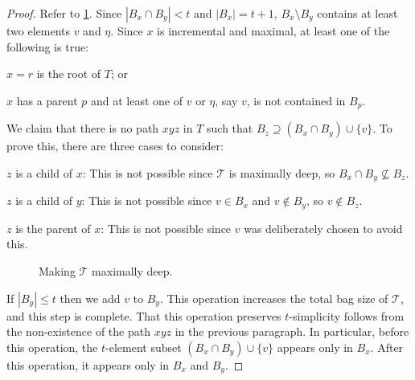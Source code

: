 \documentclass[kpfonts]{patmorin}
\theoremstyle{named}
\begin{document}
\begin{proof}
    Refer to \cref{tough-one}.
    Since $|B_x\cap B_y|< t$ and $|B_x|=t+1$, $B_x\setminus B_y$ contains at least two elements $v$ and $\eta$.  Since $x$ is incremental and maximal, at least one of the following is true:
    \begin{inparaenum}[(i)]
        \item $x=r$ is the root of $T$; or
        \item $x$ has a parent $p$ and at least one of $v$ or $\eta$, say $v$, is not contained in $B_p$.
    \end{inparaenum}
    We claim that there is no path $xyz$ in $T$ such that $B_z\supseteq (B_x\cap B_y)\cup\{v\}$. To prove this, there are three cases to consider:
    \begin{compactenum}
        \item $z$ is a child of $x$:  This is not possible since $\mathcal{T}$ is maximally deep, so $B_x\cap B_y\not\subseteq B_z$.
        \item $z$ is a child of $y$:  This is not possible since $v\in B_x$ and $v\not\in B_y$, so $v\not\in B_z$.
        \item $z$ is the parent of $x$:  This is not possible since $v$ was deliberately chosen to avoid this.
    \end{compactenum}
    \begin{figure}
        \caption{Making $\mathcal{T}$ maximally deep.}
        \label{tough-one}
    \end{figure}

    If $|B_y|\le t$ then we add $v$ to $B_y$.  This operation increases the total bag size of $\mathcal{T}$, and this step is complete.  That this operation preserves $t$-simplicity follows from the non-existence of the path $xyz$ in the previous paragraph.  In particular, before this operation, the $t$-element subset $(B_x\cap B_y)\cup\{v\}$ appears only in $B_x$. After this operation, it appears only in $B_x$ and $B_y$.


\end{proof}
\end{document}
